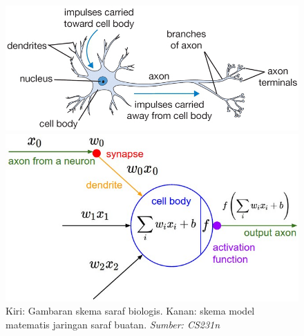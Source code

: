 \begin{figure}[ht]
  \centering
  \begin{minipage}{0.45\textwidth}
    \centering
    \includegraphics[width=1\linewidth]{gambar/neuron.png} %
  \end{minipage}\hfill
  \begin{minipage}{0.45\textwidth}
    \centering
    \includegraphics[width=1\linewidth]{gambar/neuron_model.jpeg} %
  \end{minipage}
  \label{neuron_model}
  \caption{Kiri: Gambaran skema saraf biologis. Kanan: skema model matematis jaringan saraf buatan. \emph{Sumber: CS231n}}
\end{figure}

